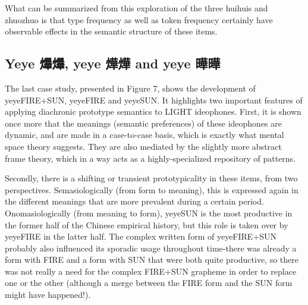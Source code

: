 What can be summarized from this exploration of the three huihuis and
zhuozhuo is that type frequency as well as token frequency certainly
have observable effects in the semantic structure of these items.

\subsection{Yeye 爗爗, yeye 燁燁 and yeye
曄曄}\label{yeye--yeye--and-yeye-}

The last case study, presented in Figure 7, shows the development of
yeyeFIRE+SUN, yeyeFIRE and yeyeSUN. It highlights two important features
of applying diachronic prototype semantics to LIGHT ideophones. First,
it is shown once more that the meanings (semantic preferences) of these
ideophones are dynamic, and are made in a case-to-case basis, which is
exactly what mental space theory suggests. They are also mediated by the
slightly more abstract frame theory, which in a way acts as a
highly-specialized repository of patterns.

Secondly, there is a shifting or transient prototypicality in these
items, from two perspectives. Semasiologically (from form to meaning),
this is expressed again in the different meanings that are more
prevalent during a certain period. Onomasiologically (from meaning to
form), yeyeSUN is the most productive in the former half of the Chinese
empirical history, but this role is taken over by yeyeFIRE in the latter
half. The complex written form of yeyeFIRE+SUN probably also influenced
its sporadic usage throughout time-there was already a form with FIRE
and a form with SUN that were both quite productive, so there was not
really a need for the complex FIRE+SUN grapheme in order to replace one
or the other (although a merge between the FIRE form and the SUN form
might have happened!).

